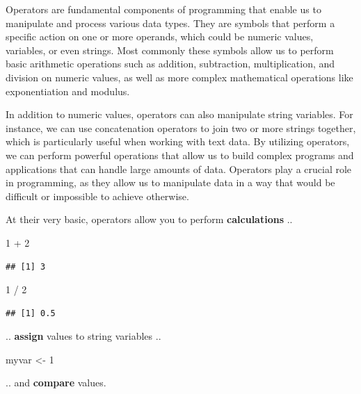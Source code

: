 \documentclass[
]{book}
\newenvironment{Shaded}{\begin{snugshade}}{\end{snugshade}}
\newcommand{\DecValTok}[1]{\textcolor[rgb]{0.00,0.00,0.81}{#1}}
\newcommand{\NormalTok}[1]{#1}
\newcommand{\OtherTok}[1]{\textcolor[rgb]{0.56,0.35,0.01}{#1}}
\newcommand{\SpecialCharTok}[1]{\textcolor[rgb]{0.00,0.00,0.00}{#1}}
\begin{document}
Operators are fundamental components of programming that enable us to manipulate and process various data types. They are symbols that perform a specific action on one or more operands, which could be numeric values, variables, or even strings. Most commonly these symbols allow us to perform basic arithmetic operations such as addition, subtraction, multiplication, and division on numeric values, as well as more complex mathematical operations like exponentiation and modulus.

In addition to numeric values, operators can also manipulate string variables. For instance, we can use concatenation operators to join two or more strings together, which is particularly useful when working with text data. By utilizing operators, we can perform powerful operations that allow us to build complex programs and applications that can handle large amounts of data. Operators play a crucial role in programming, as they allow us to manipulate data in a way that would be difficult or impossible to achieve otherwise.

At their very basic, operators allow you to perform \textbf{calculations} ..

\begin{Shaded}
\begin{Highlighting}[]
\DecValTok{1} \SpecialCharTok{+} \DecValTok{2}
\end{Highlighting}
\end{Shaded}

\begin{verbatim}
## [1] 3
\end{verbatim}

\begin{Shaded}
\begin{Highlighting}[]
\DecValTok{1} \SpecialCharTok{/} \DecValTok{2}
\end{Highlighting}
\end{Shaded}

\begin{verbatim}
## [1] 0.5
\end{verbatim}

.. \textbf{assign} values to string variables ..

\begin{Shaded}
\begin{Highlighting}[]
\NormalTok{myvar }\OtherTok{\textless{}{-}} \DecValTok{1}
\end{Highlighting}
\end{Shaded}

.. and \textbf{compare} values.
\end{document}
